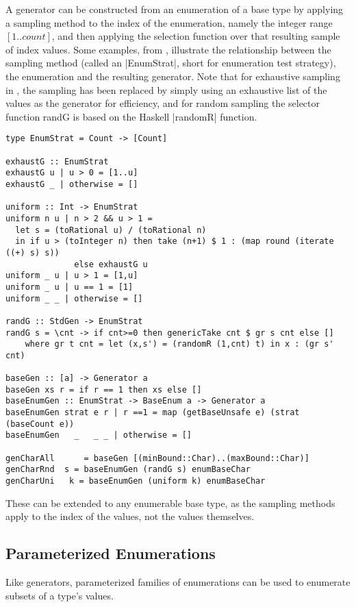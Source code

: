 A generator can be constructed from an enumeration of a base type by
applying a sampling method to the index of the enumeration,
namely the integer range $[1 .. count]$,
and then applying the selection function over that resulting sample of index values.
Some examples, from \GC, illustrate the relationship between the sampling method
(called an |EnumStrat|, short for enumeration test strategy),
the enumeration and the resulting generator.
Note that for exhaustive sampling in \GC,
the sampling has been replaced by simply using an exhaustive list of the values as the generator for efficiency,
and for random sampling the selector function randG is based on the Haskell |randomR| function.

\begin{lstlisting}
type EnumStrat = Count -> [Count]  

exhaustG :: EnumStrat
exhaustG u | u > 0 = [1..u]
exhaustG _ | otherwise = []

uniform :: Int -> EnumStrat
uniform n u | n > 2 && u > 1 = 
  let s = (toRational u) / (toRational n)
  in if u > (toInteger n) then take (n+1) $ 1 : (map round (iterate ((+) s) s))
              else exhaustG u
uniform _ u | u > 1 = [1,u]
uniform _ u | u == 1 = [1]
uniform _ _ | otherwise = []

randG :: StdGen -> EnumStrat
randG s = \cnt -> if cnt>=0 then genericTake cnt $ gr s cnt else []
    where gr t cnt = let (x,s') = (randomR (1,cnt) t) in x : (gr s' cnt)

baseGen :: [a] -> Generator a
baseGen xs r = if r == 1 then xs else []
baseEnumGen :: EnumStrat -> BaseEnum a -> Generator a
baseEnumGen strat e r | r ==1 = map (getBaseUnsafe e) (strat (baseCount e))
baseEnumGen   _   _ _ | otherwise = []

genCharAll      = baseGen [(minBound::Char)..(maxBound::Char)]
genCharRnd  s = baseEnumGen (randG s) enumBaseChar
genCharUni   k = baseEnumGen (uniform k) enumBaseChar

\end{lstlisting}

These can be extended to any enumerable base type,
as the sampling methods apply to the index of the values,
not the values themselves.

\subsection{Parameterized Enumerations}

Like generators, 
parameterized families of enumerations can be used to enumerate
subsets of a type's values.

